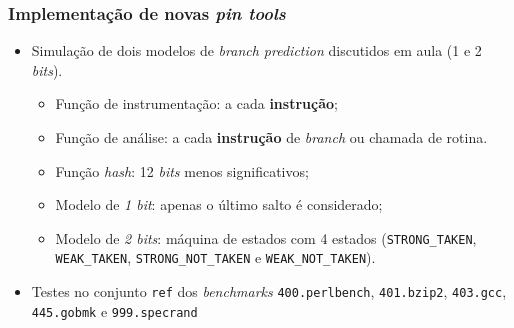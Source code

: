 \documentclass[10pt]{beamer}
\begin{document}
\begin{frame}
\frametitle{Implementação de novas \textit{pin tools}}

\begin{itemize}
  \item Simulação de dois modelos de \textit{branch prediction} discutidos em
  aula (1 e 2 \textit{bits}).
  
  \begin{itemize}
    \item Função de instrumentação: a cada \textbf{instrução};
    \item Função de análise: a cada \textbf{instrução} de \textit{branch} ou
    chamada de rotina.
    
    \vspace{12pt}
    \item Função \textit{hash}: 12 \textit{bits} menos significativos;
    \vspace{12pt}
    \item Modelo de \textit{1 bit}: apenas o último salto é considerado;
    \item Modelo de \textit{2 bits}: máquina de estados com 4 estados
    (\texttt{STRONG\_TAKEN}, \texttt{WEAK\_TAKEN}, \texttt{STRONG\_NOT\_TAKEN}
    e \texttt{WEAK\_NOT\_TAKEN}).
    
  \end{itemize}
  \vspace{12pt}
  \item Testes no conjunto \texttt{ref} dos \textit{benchmarks} \texttt{400.perlbench}, \texttt{401.bzip2},
  \texttt{403.gcc}, \texttt{445.gobmk} e \texttt{999.specrand}
  
\end{itemize}

\end{frame}
\end{document}

